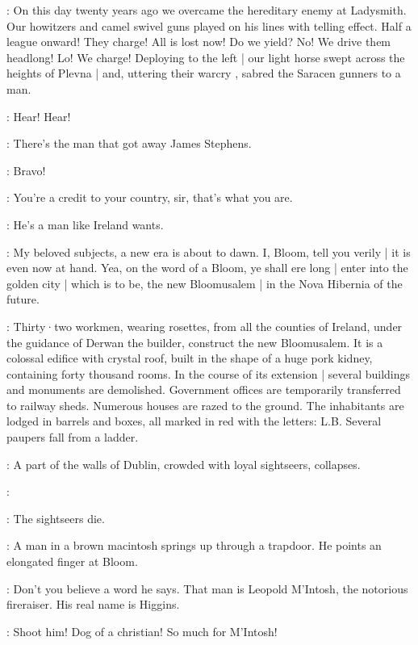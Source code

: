 \Bloom:
On this day twenty years ago we overcame the hereditary enemy at Ladysmith.
Our howitzers and camel swivel guns played on his lines with telling effect.
Half a league onward!
They charge!
All is lost now!
Do we yield?
No!
We drive them headlong!
Lo!
We charge!
Deploying to the left |
our light horse swept across the heights of Plevna |
and,
uttering their warcry ,
sabred the Saracen gunners to a man.

\Typesetters[1]:
Hear!
Hear!

\JohnWyse[2]:
There's the man that got away James Stephens.

\Bluecoat[1]:
Bravo!

\OldResident[2]:
You're a credit to your country,
sir,
that's what you are.

\AppleWoman[1]:
He's a man like Ireland wants.

\Bloom:
My beloved subjects,
a new era is about to dawn.
I,
Bloom,
tell you verily |
it is even now at hand.
Yea,
on the word of a Bloom,
ye shall ere long |
enter into the golden city |
which is to be,
the new Bloomusalem |
in the Nova Hibernia of the future.

:
Thirty·two workmen,
wearing rosettes,
from all the counties of Ireland,
under the guidance of Derwan the builder,
construct the new Bloomusalem.
It is a colossal edifice with crystal roof,
built in the shape of a huge pork kidney,
containing forty thousand rooms.
In the course of its extension |
several buildings and monuments are demolished.
Government offices are temporarily transferred to railway sheds.
Numerous houses are razed to the ground.
The inhabitants are lodged in barrels and boxes,
all marked in red with the letters:
L.B.
Several paupers fall from a ladder.

:
A part of the walls of Dublin,
crowded with loyal sightseers,
collapses.

\Sightseers:


:
The sightseers die.

:
A man in a brown macintosh springs up through a trapdoor.
He points an elongated finger at Bloom.

\Macintosh:
Don't you believe a word he says.
That man is Leopold M'Intosh,
the notorious fireraiser.
His real name is Higgins.

\Bloom:
Shoot him!
Dog of a christian!
So much for M'Intosh!


